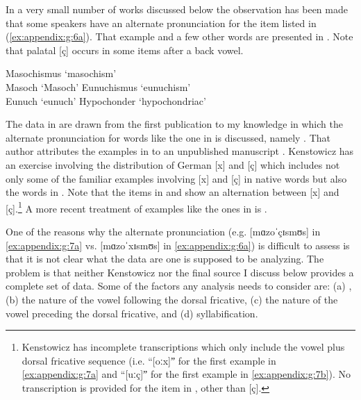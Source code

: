 In a very small number of works discussed below the observation has been made that some speakers have an alternate pronunciation for the item listed in (\ref{ex:appendix:g:6a}). That example and a few other words are presented in . Note that palatal [ç] occurs in some items after a back vowel.

\ea%
\label{ex:appendix:g:7}
\ea\label{ex:appendix:g:7a}
\relax [mɑzoːˈçɪsmʊs]  \tab  Masochismus \tab ‘masochism’\\
    \relax [ˈmɑzoːx]       \tab  Masoch      \tab ‘Masoch’
\ex\label{ex:appendix:g:7b}
\relax [ɔynuːˈçɪsmʊs]  \tab  Eunuchismus \tab ‘eunuchism’\\
    \relax [ɔyˈnuːx]       \tab  Eunuch      \tab ‘eunuch’
\ex\label{ex:appendix:g:7c}
\relax [hypoːˈçɔndɐ]   \tab  Hypochonder \tab ‘hypochondriac’
\z
\z

The data in  are drawn from the first publication to my knowledge in which the alternate pronunciation for words like the one in  is discussed, namely \citet[308]{Kenstowicz1994}. That author attributes the examples in  to an unpublished manuscript \citep{Moltmann1990}. Kenstowicz has an exercise involving the distribution of German [x] and [ç] which includes not only some of the familiar examples involving [x] and [ç] in native words but also the words in . Note that the items in  and  show an alternation between [x] and [ç].\footnote{{Kenstowicz has incomplete transcriptions which only include the vowel plus dorsal fricative sequence (i.e. “[oːx]ˮ for the first example in \ref{ex:appendix:g:7a} and “[uːç]ˮ for the first example in \ref{ex:appendix:g:7b}). No transcription is provided for the item in , other than [ç].}} A more recent treatment of examples like the ones in  is \citet{Taylor2010}. 

One of the reasons why the alternate pronunciation (e.g. [mɑzoˈçɪsmʊs] in \ref{ex:appendix:g:7a} vs. [mɑzoˈxɪsmʊs] in \ref{ex:appendix:g:6a}) is difficult to assess is that it is not clear what the data are one is supposed to be analyzing. The problem is that neither Kenstowicz nor the final source I discuss below provides a complete set of data. Some of the factors any analysis needs to consider are: (a) , (b) the nature of the vowel following the dorsal fricative, (c) the nature of the vowel preceding the dorsal fricative, and (d) syllabification.

